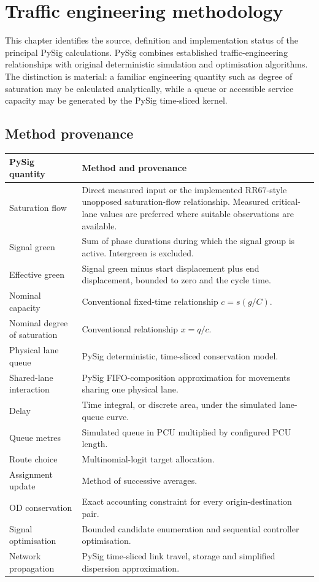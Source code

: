 \chapter{Traffic engineering methodology}
\label{chap:methodology}

This chapter identifies the source, definition and implementation status of the principal PySig calculations. PySig combines established traffic-engineering relationships with original deterministic simulation and optimisation algorithms. The distinction is material: a familiar engineering quantity such as degree of saturation may be calculated analytically, while a queue or accessible service capacity may be generated by the PySig time-sliced kernel.

\section{Method provenance}
\begin{longtable}{p{}p{}}
\toprule
\textbf{PySig quantity} & \textbf{Method and provenance}\\
\midrule\endhead
Saturation flow & Direct measured input or the implemented RR67-style unopposed saturation-flow relationship. Measured critical-lane values are preferred where suitable observations are available.\\
Signal green & Sum of phase durations during which the signal group is active. Intergreen is excluded.\\
Effective green & Signal green minus start displacement plus end displacement, bounded to zero and the cycle time.\\
Nominal capacity & Conventional fixed-time relationship $c=s(g/C)$.\\
Nominal degree of saturation & Conventional relationship $x=q/c$.\\
Physical lane queue & PySig deterministic, time-sliced conservation model.\\
Shared-lane interaction & PySig FIFO-composition approximation for movements sharing one physical lane.\\
Delay & Time integral, or discrete area, under the simulated lane-queue curve.\\
Queue metres & Simulated queue in PCU multiplied by configured PCU length.\\
Route choice & Multinomial-logit target allocation.\\
Assignment update & Method of successive averages.\\
OD conservation & Exact accounting constraint for every origin-destination pair.\\
Signal optimisation & Bounded candidate enumeration and sequential controller optimisation.\\
Network propagation & PySig time-sliced link travel, storage and simplified dispersion approximation.\\
\bottomrule
\end{longtable}

